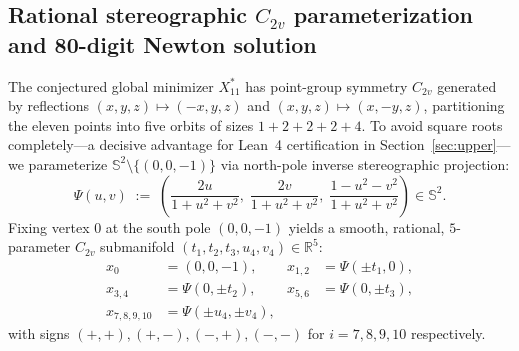 \documentclass[11pt,reqno]{amsart}
\renewcommand{\_}{\origunderscore\allowbreak}
\theoremstyle{definition}
\newcommand{\R}{\mathbb{R}}
\newcommand{\Sph}{\mathbb{S}^2}
\newcommand{\Xstar}{X^*_{11}}
\begin{document}
\subsection{Rational stereographic \texorpdfstring{$C_{2v}$}{C2v} parameterization and 80-digit Newton solution}\label{subsec:c2v}
The conjectured global minimizer $\Xstar$ has point-group symmetry $C_{2v}$ generated by reflections $(x,y,z) \mapsto (-x,y,z)$ and $(x,y,z) \mapsto (x,-y,z)$, partitioning the eleven points into five orbits of sizes $1 + 2 + 2 + 2 + 4$.
To avoid square roots completely---a decisive advantage for Lean~4 certification in Section~\ref{sec:upper}---we parameterize $\Sph \setminus \{(0,0,-1)\}$ via north-pole inverse stereographic projection:
\begin{equation}\label{eq:stereo}
  \Psi(u, v) \;:=\; \left(\frac{2u}{1+u^2+v^2},\; \frac{2v}{1+u^2+v^2},\; \frac{1-u^2-v^2}{1+u^2+v^2}\right) \in \Sph.
\end{equation}
Fixing vertex $0$ at the south pole $(0,0,-1)$ yields a smooth, rational, $5$-parameter $C_{2v}$ submanifold $(t_1, t_2, t_3, u_4, v_4) \in \R^5$:
\begin{equation}\label{eq:c2v-orbits}
  \begin{aligned}
    x_0 &= (0,0,-1), &
    x_{1,2} &= \Psi(\pm t_1, 0), \\
    x_{3,4} &= \Psi(0, \pm t_2), &
    x_{5,6} &= \Psi(0, \pm t_3), \\
    x_{7,8,9,10} &= \Psi(\pm u_4, \pm v_4),
  \end{aligned}
\end{equation}
with signs $(+,+),(+,-),(-,+),(-,-)$ for $i = 7,8,9,10$ respectively.
\end{document}
